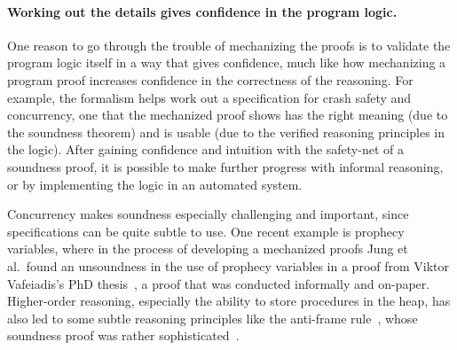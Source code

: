

\paragraph{Working out the details gives confidence in the program logic.} One
reason to go through the trouble of mechanizing the proofs is to validate the
program logic itself in a way that gives confidence, much like how mechanizing a program proof increases
confidence in the correctness of the reasoning. For example, the formalism helps
work out a specification for crash safety and concurrency, one that the
mechanized proof shows has the right meaning (due to the soundness theorem) and
is usable (due to the verified reasoning principles in the logic). After gaining
confidence and intuition with the safety-net of a soundness proof, it is possible to make
further progress with informal reasoning, or by implementing the logic in an automated system.

Concurrency makes soundness especially challenging and important, since specifications can be quite
subtle to use. One recent example is prophecy variables, where in the process of
developing a mechanized proofs Jung et al.\ found an unsoundness in the use of
prophecy variables in a proof from Viktor Vafeiadis's PhD
thesis~\cite{jung:prophecy,vafeiadis-phd}, a proof that was conducted informally
and on-paper. Higher-order reasoning, especially the ability to store procedures
in the heap, has also led to some subtle reasoning principles like the
anti-frame rule~\cite{pottier:anti-frame}, whose soundness proof was rather
sophisticated~\cite{schwinghammer:semantic-anti-frame}.


